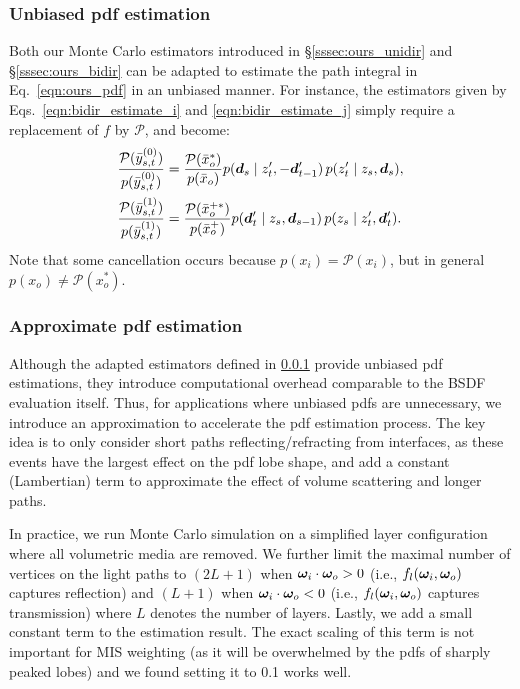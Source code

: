 \subsubsection{Unbiased pdf estimation}
\label{sssec:ours_pdf_unbiased}
%
Both our Monte Carlo estimators introduced in \S\ref{sssec:ours_unidir} and \S\ref{sssec:ours_bidir} can be adapted to estimate the path integral in Eq.~\eqref{eqn:ours_pdf} in an unbiased manner.
For instance, the estimators given by Eqs.~\eqref{eqn:bidir_estimate_i} and \eqref{eqn:bidir_estimate_j} simply require a replacement of $f$ by $\mathcal P$, and become:
%
\begin{align}
	\label{eqn:bidir_pdf_i}
	\frac{\mathcal{P}(\bar{y}^{(0)}_{s, t})}{p(\bar{y}^{(0)}_{s, t})} &= \frac{\mathcal{P}(\bar{x}_o^*)}{p(\bar{x}_o)}
	 p( \bm{d}_s \;|\; z'_t, -\bm{d}'_{t - 1}) \, p(z'_t \;|\; z_s, \bm{d}_s),\\
	\label{eqn:bidir_pdf_j}
	\frac{\mathcal{P}(\bar{y}^{(1)}_{s, t})}{p(\bar{y}^{(1)}_{s, t})} &= \frac{\mathcal{P}(\bar{x}_o^{+*})}{p(\bar{x}_o^+)}
	 p( \bm{d}'_t \;|\; z_s, \bm{d}_{s - 1}) \, p(z_s \;|\; z'_t, \bm{d}'_t ).
\end{align}
%
Note that some cancellation occurs because $p(x_i) = \mathcal P(x_i)$, but in general $p(x_o) \neq \mathcal P(x_o^*)$.


\subsubsection{Approximate pdf estimation}
\label{sssec:ours_pdf_approx}
%
Although the adapted estimators defined in \ref{sssec:ours_pdf_unbiased} provide unbiased pdf estimations, they introduce computational overhead comparable to the BSDF evaluation itself.
Thus, for applications where unbiased pdfs are unnecessary, we introduce an approximation to accelerate the pdf estimation process. The key idea is to only consider short paths reflecting/refracting from interfaces, as these events have the largest effect on the pdf lobe shape, and add a constant (Lambertian) term to approximate the effect of volume scattering and longer paths.

In practice, we run Monte Carlo simulation on a simplified layer configuration where all volumetric media are removed.
We further limit the maximal number of vertices on the light paths to $(2L + 1)$ when $\bm{\omega}_i \cdot \bm{\omega}_o > 0$ (i.e., $f_l(\bm{\omega}_i, \bm{\omega}_o)$ captures reflection) and $(L + 1)$ when $\bm{\omega}_i \cdot \bm{\omega}_o < 0$ (i.e., $f_l(\bm{\omega}_i, \bm{\omega}_o)$ captures transmission) where $L$ denotes the number of layers.
Lastly, we add a small constant term to the estimation result. The exact scaling of this term is not important for MIS weighting (as it will be overwhelmed by the pdfs of sharply peaked lobes) and we found setting it to 0.1 works well.

